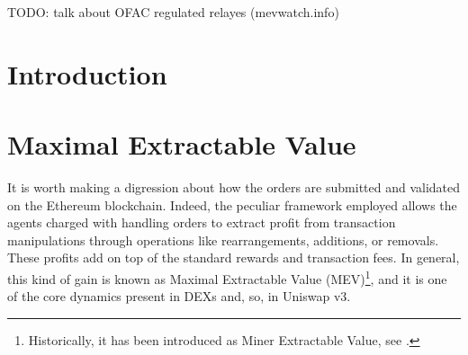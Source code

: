 \documentclass[a4paper,11pt]{article}
\begin{document}
TODO: talk about OFAC regulated relayes (mevwatch.info)
\section{Introduction}
\section{Maximal Extractable Value}
\label{sec:mev}

It is worth making a digression about how the orders are submitted and validated on the Ethereum blockchain. Indeed, the peculiar framework employed allows the agents charged with handling orders to extract profit from transaction manipulations through operations like rearrangements, additions, or removals. These profits add on top of the standard rewards and transaction fees. In general, this kind of gain is known as Maximal Extractable Value (MEV)\footnote{Historically, it has been introduced as Miner Extractable Value, see \cite{daian2019flash}.}, and it is one of the core dynamics present in DEXs and, so, in Uniswap v3. \\
\end{document}
